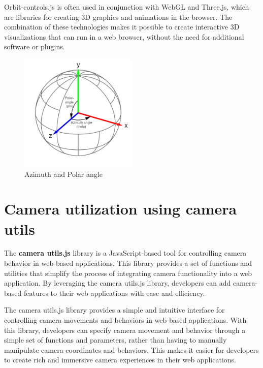 Orbit-controls.js is often used in conjunction with WebGL and Three.js, which are libraries for creating 
3D graphics and animations in the browser. The combination of these technologies makes it possible to create 
interactive 3D visualizations that can run in a web browser, without the need for additional software or plugins.
\\
\begin{figure}[htb]
  \centering
  \includegraphics[width=0.5\textwidth]{pics/orbitcontrols.png}
  \caption{Azimuth and Polar angle}
  \label{fig:orbitcontrols}
\end{figure}
\newpage

\section{Camera utilization using camera utils}
The \textbf{camera utils.js} library is a JavaScript-based tool for controlling camera behavior in web-based applications. 
This library provides a set of functions and utilities that simplify the process of integrating camera functionality 
into a web application. By leveraging the camera utils.js library, developers can add camera-based features to 
their web applications with ease and efficiency.

The camera utils.js library provides a simple and intuitive interface for controlling camera movements and behaviors 
in web-based applications. With this library, developers can specify camera movement and behavior through a simple 
set of functions and parameters, rather than having to manually manipulate camera coordinates and behaviors. 
This makes it easier for developers to create rich and immersive camera experiences in their web applications.

